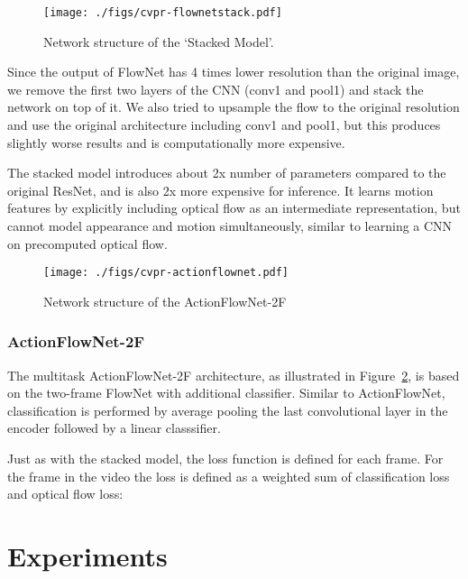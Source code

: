 \documentclass[10pt,twocolumn,letterpaper]{article}
\begin{document}
\begin{figure}[h!]
\centering
\texttt{[image: ./figs/cvpr-flownetstack.pdf]}	
  \caption{Network structure of the `Stacked Model'.}
	\label{fig:stacked_archi}
  \vspace{-.5em}
\end{figure}



Since the output of FlowNet has 4 times lower resolution than the original image, we remove the first two layers of the CNN (conv1 and pool1) and stack the network on top of it.
We also tried to upsample the flow to the original resolution and use the original architecture including conv1 and pool1, but this produces slightly worse results and is computationally more expensive.

The stacked model introduces about 2x number of parameters compared to the original ResNet, and is also 2x more expensive for inference.
It learns motion features by explicitly including optical flow as an intermediate representation, but cannot model appearance and motion simultaneously, similar to learning a CNN on precomputed optical flow.

\begin{figure}[th!]
\centering
\texttt{[image: ./figs/cvpr-actionflownet.pdf]}	
	\caption{Network structure of the ActionFlowNet-2F}
	\vspace{-2em}
	\label{fig:mt_archi}
\end{figure}

\subsubsection{ActionFlowNet-2F}
The multitask ActionFlowNet-2F architecture, as illustrated in Figure~\ref{fig:mt_archi}, is based on the two-frame FlowNet with additional classifier. 
Similar to ActionFlowNet, classification is performed by average pooling the last convolutional layer in the encoder followed by a linear classsifier.


Just as with the stacked model, the loss function is defined for each frame.
For the  frame in the  video the loss is defined as a weighted sum of classification loss and optical flow loss:
\vspace{-1em}


\vspace{-2.5em}
 

\section{Experiments}
\label{sec:exp}
\end{document}
